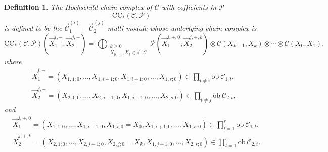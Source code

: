 \documentclass[11pt]{amsproc}
\def\cP{\mathcal{P}}
\def\cc{\mathcal{C}}
\def\r#1{\mathrm{#1}}
\def\ob{\mathrm{ob\ }}
\newtheorem{defn}[lem]{Definition}
\theoremstyle{remark}
\numberwithin{equation}{section}
\begin{document}
\begin{defn}
The Hochschild chain complex of $\cc$ with cofficients in $\cP$
\begin{equation}
\r{CC}_{*}(\cc, \cP)
\end{equation}
is defined to be the $\overrightarrow{\cc}_{1}^{(i)} - \overrightarrow{\cc}_{2}^{(j)}$ multi-module whose underlying chain complex is
\begin{equation}
\r{CC}_{*}(\cc, \cP)(\vec{X}_{1}^{i, -}; \vec{X}_{2}^{j, -}) = \bigoplus_{\substack{k \ge 0\\ X_{0}, \ldots, X_{k} \in \ob \cc}} \cP(\vec{X}_{1}^{i, +, 0}; \vec{X}_{2}^{j, +, k}) \otimes \cc(X_{k-1}, X_{k}) \otimes \cdots \otimes \cc(X_{0}, X_{1}),
\end{equation}
where  
\begin{align}
&\vec{X}_{1}^{i, -} = (X_{1, 1; 0}, \ldots, X_{1, i-1; 0}, X_{1, i+1; 0}, \ldots, X_{1, r; 0}) \in \prod_{t \neq i} \ob \cc_{1, t}, \\
&\vec{X}_{2}^{j, -} = (X_{2, 1; 0}, \ldots, X_{2, j-1; 0}, X_{1, j+1; 0}, \ldots, X_{2, s; 0}) \in \prod_{t \neq j} \ob \cc_{2, t},
\end{align}
and
\begin{align}
&\vec{X}_{1}^{i, +, 0} = (X_{1, 1; 0}, \ldots, X_{1, i-1; 0}, X_{1, i; 0} = X_{0}, X_{1, i+1; 0}, \ldots, X_{1, r; 0}) \in \prod_{t=1}^{r} \ob \cc_{1, t}, \\
&\vec{X}_{2}^{j, +, k} = (X_{2, 1; 0}, \ldots, X_{2, j-1; 0}, X_{2, j; 0} = X_{k}, X_{1, j+1; 0}, \ldots, X_{2, s; 0}) \in \prod_{t=1}^{s} \ob \cc_{2, t}.
\end{align}


\end{defn}
\end{document}
